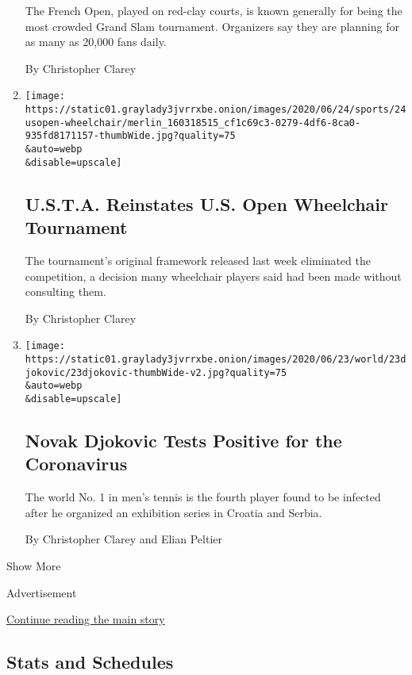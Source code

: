 \begin{enumerate}
  The French Open, played on red-clay courts, is known generally for
  being the most crowded Grand Slam tournament. Organizers say they are
  planning for as many as 20,000 fans daily.

  By Christopher Clarey
\item
  \href{/2020/06/25/sports/tennis/us-open-wheelchair-tournament.html}{}

  \texttt{[image: https://static01.graylady3jvrrxbe.onion/images/2020/06/24/sports/24usopen-wheelchair/merlin\_160318515\_cf1c69c3-0279-4df6-8ca0-935fd8171157-thumbWide.jpg?quality=75\\\&auto=webp\\\&disable=upscale]}

  \hypertarget{usta-reinstates-us-open-wheelchair-tournament}{%
  \subsection{U.S.T.A. Reinstates U.S. Open Wheelchair
  Tournament}\label{usta-reinstates-us-open-wheelchair-tournament}}

  The tournament's original framework released last week eliminated the
  competition, a decision many wheelchair players said had been made
  without consulting them.

  By Christopher Clarey
\item
  \href{/2020/06/23/sports/tennis/novak-djokovic-coronavirus.html}{}

  \texttt{[image: https://static01.graylady3jvrrxbe.onion/images/2020/06/23/world/23djokovic/23djokovic-thumbWide-v2.jpg?quality=75\\\&auto=webp\\\&disable=upscale]}

  \hypertarget{novak-djokovic-tests-positive-for-the-coronavirus}{%
  \subsection{Novak Djokovic Tests Positive for the
  Coronavirus}\label{novak-djokovic-tests-positive-for-the-coronavirus}}

  The world No. 1 in men's tennis is the fourth player found to be
  infected after he organized an exhibition series in Croatia and
  Serbia.

  By Christopher Clarey and Elian Peltier
\end{enumerate}

Show More

Advertisement

\protect\hyperlink{after-mid1}{Continue reading the main story}

\hypertarget{stats-and-schedules}{%
\subsection{Stats and Schedules}\label{stats-and-schedules}}

